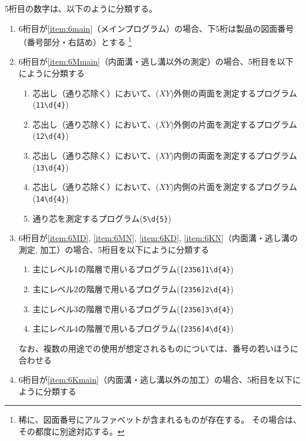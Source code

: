 5桁目の数字は、以下のように分類する。
\begin{enumerate}[label=\alph*)]
\item 6桁目が\ref{item:6main}（メインプログラム）の場合、下5桁は製品の図面番号（番号部分・右詰め）とする
\footnote{稀に、図面番号にアルファベットが含まれるものが存在する。
その場合は、その都度に別途対応する。}
\item 6桁目が\ref{item:6Mmain}（内面溝・逃し溝以外の測定）の場合、5桁目を以下にように分類する
  \begin{enumerate}[label=\arabic*., ref=\arabic*]
  \item\label{item:5MCOB} 芯出し（通り芯除く）において、($XY$)外側の両面を測定するプログラム(\verb|11\d{4}|)
  \item\label{item:5MCOO} 芯出し（通り芯除く）において、($XY$)外側の片面を測定するプログラム(\verb|12\d{4}|)
  \item\label{item:5MCIB} 芯出し（通り芯除く）において、($XY$)内側の両面を測定するプログラム(\verb|13\d{4}|)
  \item\label{item:5MCIO} 芯出し（通り芯除く）において、($XY$)内側の片面を測定するプログラム(\verb|14\d{4}|)
  \item\label{item:5MCL} 通り芯を測定するプログラム(\verb|5\d{5}|)
  \end{enumerate}
\item 6桁目が\ref{item:6MD}, \ref{item:6MN}, \ref{item:6KD}, \ref{item:6KN}（内面溝・逃し溝の測定, 加工）の場合、5桁目を以下にように分類する
  \begin{enumerate}[label=\arabic*., ref=\arabic*]
  \item 主にレベル1の階層で用いるプログラム(\verb|[2356]1\d{4}|)
  \item 主にレベル2の階層で用いるプログラム(\verb|[2356]2\d{4}|)
  \item 主にレベル3の階層で用いるプログラム(\verb|[2356]3\d{4}|)
  \item 主にレベル4の階層で用いるプログラム(\verb|[2356]4\d{4}|)
  \end{enumerate}
  なお、複数の用途での使用が想定されるものについては、番号の若いほうに合わせる
\item 6桁目が\ref{item:6Kmain}（内面溝・逃し溝以外の加工）の場合、5桁目を以下にように分類する
  \begin{enumerate}[label=\arabic*., ref=\arabic*]

\end{enumerate}
\end{enumerate}
